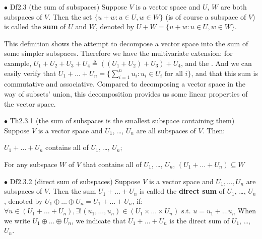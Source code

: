 \documentclass{article}
\begin{document}
\begin{Df}{$\bullet$ Df2.3 (the sum of subspaces)}
    Suppose $V$ is a vector space and $U$, $W$ are both subspaces of $V$. Then the set $\{u+w: u\in U, w\in W\}$ (is of course a subspace of $V$) is called the \textbf{sum} of $U$ and $W$, denoted by $U+W = \{u+w: u\in U, w\in W\}$.
\end{Df}

\begin{Rmk}{}
    This definition shows the attempt to decompose a vector space into the sum of some simpler subspaces. Therefore we have the multivariate extension: \textcolor{Df}{for example, $U_1+U_2+U_3+U_4 \triangleq ((U_1+U_2)+U_3)+U_4$, and the }. And we can easily verify that \textcolor{Th}{$U_1+\dots + U_n = \{\sum_{i=1}^{n} u_i: u_i\in U_i \text{ for all } i\}$, and that this sum is commutative and associative.} Compared to decomposing a vector space in the way of subsets' union, this decomposition provides us some linear properties of the vector space.
\end{Rmk}

\begin{Th}{$\bullet$ Th2.3.1 (the sum of subspaces is the smallest subspace containing them)}
    Suppose $V$ is a vector space and $U_1$, \dots, $U_n$ are all subspaces of $V$. Then:
    \begin{compactenum}
        \item $U_1+\dots + U_n$ contains all of $U_1$, \dots, $U_n$;
        \item For any subspace $W$ of $V$ that contains all of $U_1$, \dots, $U_n$, $(U_1+\dots + U_n)\subseteq W$
    \end{compactenum}
    \tcblower
\end{Th}

\begin{Df}{$\bullet$ Df2.3.2 (direct sum of subspaces)}
    Suppose $V$ is a vector space and $U_1, \dots, U_n$ are subspaces of $V$. Then the sum $U_1+\dots+U_n$ is called the \textbf{direct sum} of $U_1$, \dots, $U_n$, denoted by $U_1\oplus\dots\oplus U_n = U_1+\dots+U_n$, if:\\
        $\forall u\in (U_1+\dots+U_n), \exists! (u_1, \dots, u_n)\in (U_1\times\dots\times U_n) \text{  s.t.  } u = u_1+\dots u_n$
    When we write $U_1\oplus\dots\oplus U_n$, we indicate that $U_1+\dots+U_n$ is the direct sum of $U_1$, \dots, $U_n$.
\end{Df}
\end{document}
